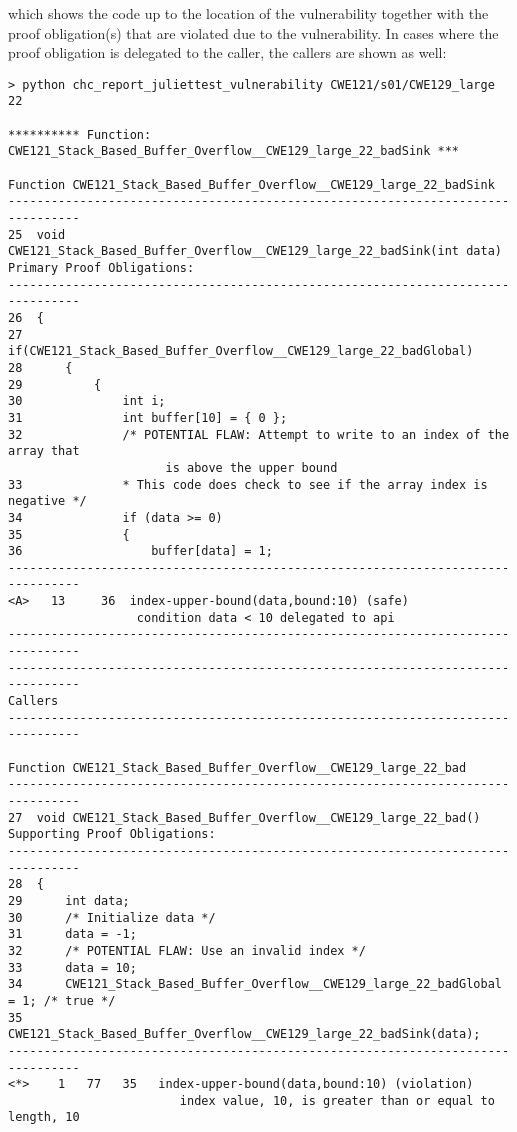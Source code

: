 \documentclass[11pt]{article}
\begin{document}
which shows the code up to the location of the vulnerability together with the
proof obligation(s) that are violated due to the vulnerability. In cases where
the proof obligation is delegated to the caller, the callers are shown as well:
\begin{small}
\begin{verbatim}
> python chc_report_juliettest_vulnerability CWE121/s01/CWE129_large 22

********** Function: CWE121_Stack_Based_Buffer_Overflow__CWE129_large_22_badSink ***

Function CWE121_Stack_Based_Buffer_Overflow__CWE129_large_22_badSink
--------------------------------------------------------------------------------
25  void CWE121_Stack_Based_Buffer_Overflow__CWE129_large_22_badSink(int data)
Primary Proof Obligations:
--------------------------------------------------------------------------------
26  {
27      if(CWE121_Stack_Based_Buffer_Overflow__CWE129_large_22_badGlobal)
28      {
29          {
30              int i;
31              int buffer[10] = { 0 };
32              /* POTENTIAL FLAW: Attempt to write to an index of the array that 
                      is above the upper bound
33              * This code does check to see if the array index is negative */
34              if (data >= 0)
35              {
36                  buffer[data] = 1;
--------------------------------------------------------------------------------
<A>   13     36  index-upper-bound(data,bound:10) (safe)
                  condition data < 10 delegated to api
--------------------------------------------------------------------------------
--------------------------------------------------------------------------------
Callers
--------------------------------------------------------------------------------

Function CWE121_Stack_Based_Buffer_Overflow__CWE129_large_22_bad
--------------------------------------------------------------------------------
27  void CWE121_Stack_Based_Buffer_Overflow__CWE129_large_22_bad()
Supporting Proof Obligations:
--------------------------------------------------------------------------------
28  {
29      int data;
30      /* Initialize data */
31      data = -1;
32      /* POTENTIAL FLAW: Use an invalid index */
33      data = 10;
34      CWE121_Stack_Based_Buffer_Overflow__CWE129_large_22_badGlobal = 1; /* true */
35      CWE121_Stack_Based_Buffer_Overflow__CWE129_large_22_badSink(data);
--------------------------------------------------------------------------------
<*>    1   77   35   index-upper-bound(data,bound:10) (violation)
                        index value, 10, is greater than or equal to length, 10



\end{verbatim}
\end{small}
\end{document}
